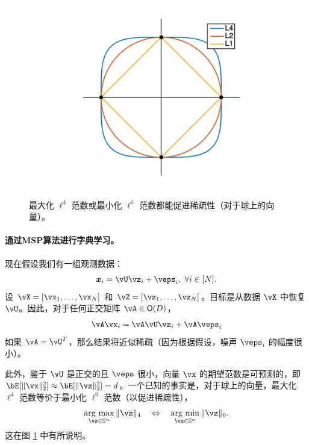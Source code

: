 \documentclass[../../book-main.tex]{subfiles}
\begin{document}
\begin{figure}
    \centering
    \includegraphics[width=0.6\linewidth]{figs_chap2/2DL4Sphere.png}\vspace{-0.1in}
    \caption{最大化 $\ell^4$ 范数或最小化 $\ell^1$ 范数都能促进稀疏性（对于球上的向量）。}
    \label{fig:L4-sphere}
\end{figure}


\paragraph{通过MSP算法进行字典学习。}

现在假设我们有一组观测数据：
\begin{equation}
    \x_i = \vU \vz_i + \veps_i,\ \forall i \in [N].
\end{equation}
设 $\vX = [\vx_1, \dots, \vx_N]$ 和 $\vZ = [\vz_1, \dots, \vz_N]$。目标是从数据 $\vX$ 中恢复 $\vU$。因此，对于任何正交矩阵 $\vA \in \O(D)$，
\begin{equation}
    \vA\vx_i = \vA\vU \vz_i + \vA\veps_i
\end{equation}
如果 $\vA = \vU^T$，那么结果将近似稀疏（因为根据假设，噪声 $\veps_i$ 的幅度很小）。

此外，鉴于 $\vU$ 是正交的且 $\veps$ 很小，向量 $\vx$ 的期望范数是可预测的，即 $\bE[\norm{\vx}_2^2] \approx \bE[\norm{\vz}_2^2]=d$。一个已知的事实是，对于球上的向量，最大化 $\ell^4$ 范数等价于最小化 $\ell^0$ 范数（以促进稀疏性），
\begin{equation}
    \argmax_{\vz \in \mathbb{S}^n}\|\vz\|_{4}\quad\Leftrightarrow\quad \argmin_{\vz \in \mathbb{S}^n}\|\vz\|_{0}.
\end{equation}
这在图 \ref{fig:L4-sphere} 中有所说明。
\end{document}
